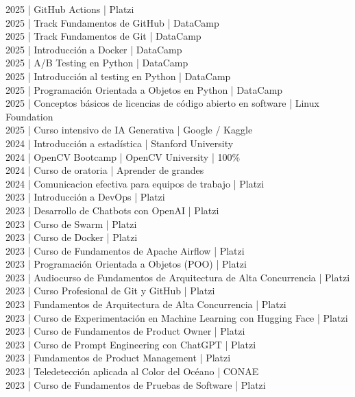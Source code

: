 {2025 | GitHub Actions | Platzi \\
2025 | Track Fundamentos de GitHub | DataCamp \\
2025 | Track Fundamentos de Git | DataCamp \\
2025 | Introducción a Docker | DataCamp \\
2025 | A/B Testing en Python | DataCamp \\
2025 | Introducción al testing en Python  | DataCamp \\
2025 | Programación Orientada a Objetos en Python | DataCamp \\
2025 | Conceptos básicos de licencias de código abierto en software | Linux Foundation \\
2025 | Curso intensivo de IA Generativa  | Google / Kaggle \\
2024 | Introducción a estadística | Stanford University \\
2024 | OpenCV Bootcamp | OpenCV University | 100\% \\
2024 | Curso de oratoria | Aprender de grandes \\
2024 | Comunicacion efectiva para equipos de trabajo | Platzi \\
2023 | Introducción a DevOps | Platzi \\
2023 | Desarrollo de Chatbots con OpenAI  | Platzi \\
2023 | Curso de Swarm | Platzi \\
2023 | Curso de Docker | Platzi \\
2023 | Curso de Fundamentos de Apache Airflow | Platzi \\
2023 | Programación Orientada a Objetos (POO) | Platzi \\
2023 | Audiocurso de Fundamentos de Arquitectura de Alta Concurrencia | Platzi \\
2023 | Curso Profesional de Git y GitHub | Platzi \\
2023 | Fundamentos de Arquitectura de Alta Concurrencia | Platzi \\
2023 | Curso de Experimentación en Machine Learning con Hugging Face | Platzi \\
2023 | Curso de Fundamentos de Product Owner | Platzi \\
2023 | Curso de Prompt Engineering con ChatGPT | Platzi \\
2023 | Fundamentos de Product Management | Platzi \\
2023 | Teledetección aplicada al Color del Océano | CONAE \\
2023 | Curso de Fundamentos de Pruebas de Software | Platzi \\
}
